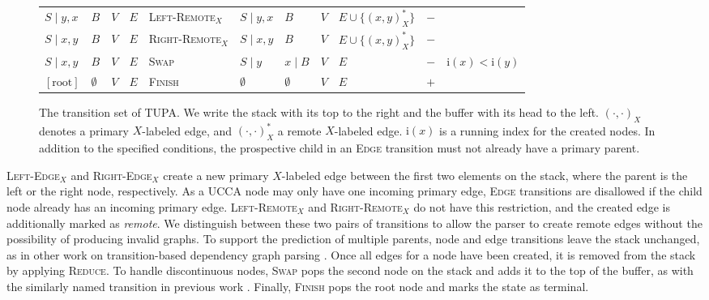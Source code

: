\documentclass[11pt,a4paper]{article}
\newcommand{\parser}[1]{TUPA\textsubscript{#1}}
\begin{document}
\begin{figure*}
\begin{adjustbox}{width=\textwidth,margin=3pt,frame}
\begin{tabular}{llll|l|llllc|c}
$S \;|\; y,x$ & $B$ & $V$ & $E$ & \textsc{Left-Remote$_X$} & $S \;|\; y,x$ & $B$ & $V$ & $E \cup \{ (x,y)_X^* \}$ & $-$ & \\
$S \;|\; x,y$ & $B$ & $V$ & $E$ & \textsc{Right-Remote$_X$} & $S \;|\; x,y$ & $B$ & $V$ & $E \cup \{ (x,y)_X^* \}$ & $-$ & \\
$S \;|\; x,y$ & $B$ & $V$ & $E$ & \textsc{Swap} & $S \;|\; y$ & $x \;|\; B$ & $V$ & $E$ & $-$ &
$\mathrm{i}(x) < \mathrm{i}(y)$ \\
$[\mathrm{root}]$ & $\emptyset$ & $V$ & $E$ & \textsc{Finish} & $\emptyset$ & $\emptyset$ & $V$ & $E$ & $+$ & \\
\end{tabular}
\end{adjustbox}
\caption{\label{fig:transitions}
  The transition set of \parser{}. %
  We write the stack with its top to the right and the buffer with its head to the left.
  $(\cdot,\cdot)_X$ denotes a primary $X$-labeled edge, and $(\cdot,\cdot)_X^*$ a remote $X$-labeled edge.
  $\mathrm{i}(x)$ is a running index for the created nodes.
  In addition to the specified conditions,
  the prospective child in an \textsc{Edge} transition must not already have a primary parent.
}
\end{figure*}

\textsc{Left-Edge$_X$} and \textsc{Right-Edge$_X$} create a new primary $X$-labeled edge between the first two elements on the stack, where the parent is the left or the right node, respectively.
As a UCCA node may only have one incoming primary edge,
\textsc{Edge} transitions are disallowed if the child node already
has an incoming primary edge.
\textsc{Left-Remote$_X$} and \textsc{Right-Remote$_X$} do not have this restriction,
and the created edge is additionally marked as \textit{remote}.
We distinguish between these two pairs of transitions to allow the parser to create remote edges
without the possibility of producing invalid graphs.
To support the prediction of multiple parents, node and edge transitions
leave the stack unchanged, as in other work on
transition-based dependency graph parsing
\cite{sagae2008shift,ribeyre-villemontedelaclergerie-seddah:2014:SemEval,tokgoz2015transition}.
Once all edges for a node have been created, it is removed from the stack
by applying \textsc{Reduce}.
To handle discontinuous nodes, \textsc{Swap} pops the second
node on the stack and adds it to the top of the buffer, as with the similarly
named transition in previous work \cite{nivre2009non,maier2015discontinuous}.
Finally, \textsc{Finish} pops the root node and marks the state as terminal.
\end{document}
